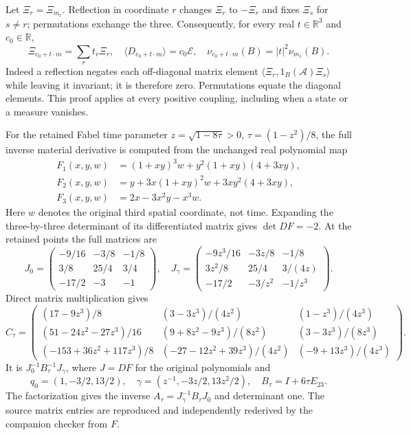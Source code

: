 \documentclass[11pt]{article}
\begin{document}
Let $\Xi_r=\Xi_{m_r}$. Reflection in coordinate $r$ changes $\Xi_r$ to
$-\Xi_r$ and fixes $\Xi_s$ for $s\ne r$; permutations exchange the three.
Consequently, for every real $t\in\mathbb R^3$ and $c_0\in\mathbb R$,
\begin{equation}\label{eq:fabel-affine-raw}
 \Xi_{c_0+t\cdot m}=\sum_rt_r\Xi_r,\quad
 \langle D_{c_0+t\cdot m}\rangle=c_0\mathcal E,\quad
 \nu_{c_0+t\cdot m}(B)=|t|^2\nu_{m_1}(B).
\end{equation}
Indeed a reflection negates each off-diagonal matrix element
$\langle\Xi_r,1_B(\mathcal A)\Xi_s\rangle$ while leaving it invariant;
it is therefore zero. Permutations equate the diagonal elements.
This proof applies at every positive coupling, including when a state
or a measure vanishes.

For the retained Fabel time parameter $z=\sqrt{1-8\tau}>0$,
$\tau=(1-z^2)/8$, the full inverse material derivative is
computed from the unchanged real polynomial map
\begin{align*}
 F_1(x,y,w)&=(1+xy)^3w+y^2(1+xy)(4+3xy),\\
 F_2(x,y,w)&=y+3x(1+xy)^2w+3xy^2(4+3xy),\\
 F_3(x,y,w)&=2x-3x^2y-x^3w .
\end{align*}
Here $w$ denotes the original third spatial coordinate, not time.
Expanding the three-by-three determinant of its differentiated matrix
gives $\det DF=-2$. At the retained points the full matrices are
\[
 J_0=\begin{pmatrix}-9/16&-3/8&-1/8\\3/8&25/4&3/4\\-17/2&-3&-1\end{pmatrix},
 \quad
 J_\gamma=\begin{pmatrix}
 -9z^3/16&-3z/8&-1/8\\3z^2/8&25/4&3/(4z)\\-17/2&-3/z^2&-1/z^3
 \end{pmatrix}.
\]
Direct matrix multiplication gives
\begin{equation}\label{eq:fabel-C-full}
 C_\tau=
 \begin{pmatrix}
 (17-9z^3)/8&(3-3z^3)/(4z^2)&(1-z^3)/(4z^3)\\
 (51-24z^2-27z^3)/16&(9+8z^2-9z^3)/(8z^2)&(3-3z^3)/(8z^3)\\
 (-153+36z^2+117z^3)/8&(-27-12z^2+39z^3)/(4z^2)&(-9+13z^3)/(4z^3)
 \end{pmatrix}.
\end{equation}
It is $J_0^{-1}B_\tau^{-1}J_\gamma$, where $J=DF$ for the original
polynomials and
\[
q_0=(1,-3/2,13/2),\quad
\gamma=(z^{-1},-3z/2,13z^2/2),\quad B_\tau=I+6\tau E_{23}.
\]
The factorization gives the inverse $A_\tau=J_\gamma^{-1}B_\tau J_0$
and determinant one.
The source matrix entries are reproduced and independently rederived
by the companion checker from $F$.
\end{document}
